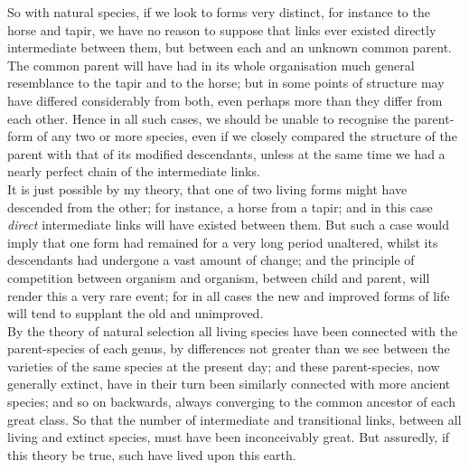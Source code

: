 \indent So with natural species, if we look to forms very distinct, for instance to the horse and tapir, we have no reason to suppose that links ever existed directly intermediate between them, but between each and an unknown common parent. The common parent will have had in its whole organisation much general resemblance to the tapir and to the horse; but in some points of structure may have differed considerably from both, even perhaps more than they differ from each other. Hence in all such cases, we should be unable to recognise the parent-form of any two or more species, even if we closely compared the structure of the parent with that of its modified descendants, unless at the same time we had a nearly perfect chain of the intermediate links.\\
\indent It is just possible by my theory, that one of two living forms might have descended from the other; for instance, a horse from a tapir; and in this case \emph{direct} intermediate links will have existed between them. But such a case would imply that one form had remained for a very long period unaltered, whilst its descendants had undergone a vast amount of change; and the principle of competition between organism and organism, between child and parent, will render this a very rare event; for in all cases the new and improved forms of life will tend to supplant the old and unimproved.\\
\indent By the theory of natural selection all living species have been connected with the parent-species of each genus, by differences not greater than we see between the varieties of the same species at the present day; and these parent-species, now generally extinct, have in their turn been similarly connected with more ancient species; and so on backwards, always converging to the common ancestor of each great class. So that the number of intermediate and transitional links, between all living and extinct species, must have been inconceivably great. But assuredly, if this theory be true, such have lived upon this earth.\\
